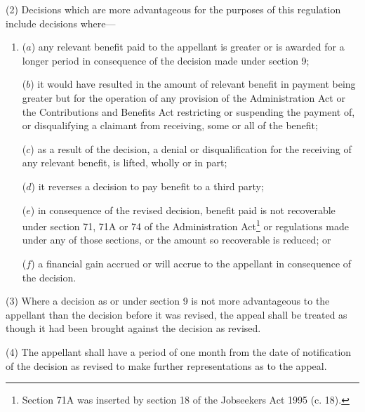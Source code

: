 \documentclass[12pt,a4paper]{article}
\begin{document}
(2) Decisions which are more advantageous for the purposes of this regulation include decisions where—
\begin{enumerate}\item[]
($a$) any relevant benefit paid to the appellant is greater or is awarded for a longer period in consequence of the decision made under section 9;

($b$) it would have resulted in the amount of relevant benefit in payment being greater but for the operation of any provision of the Administration Act or the Contributions and Benefits Act restricting or suspending the payment of, or disqualifying a claimant from receiving, some or all of the benefit;

($c$) as a result of the decision, a denial or disqualification for the receiving of any relevant benefit, is lifted, wholly or in part;

($d$) it reverses a decision to pay benefit to a third party;

($e$) in consequence of the revised decision, benefit paid is not recoverable under section 71, 71A or 74 of the Administration Act\footnote{\frenchspacing Section 71A was inserted by section 18 of the Jobseekers Act 1995 (c. 18).} or regulations made under any of those sections, or the amount so recoverable is reduced; or

($f$) a financial gain accrued or will accrue to the appellant in consequence of the decision.
\end{enumerate}

(3) Where a decision as 
%
%
or under section 9 is not more advantageous to the appellant than the decision before it was 
%
revised, the appeal shall be treated as though it had been brought against the decision as 
%
revised.

(4) The appellant shall have a period of one month from the date of notification of the decision as 
%
revised to make further representations as to the appeal.
\end{document}
